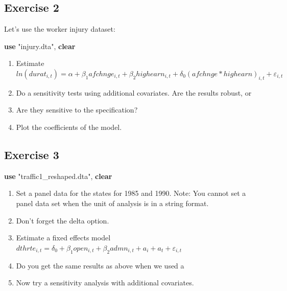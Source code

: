 \documentclass[
]{book}
\newenvironment{Shaded}{\begin{snugshade}}{\end{snugshade}}
\newcommand{\KeywordTok}[1]{\textcolor[rgb]{0.13,0.29,0.53}{\textbf{#1}}}
\newcommand{\NormalTok}[1]{#1}
\newcommand{\StringTok}[1]{\textcolor[rgb]{0.31,0.60,0.02}{#1}}
\providecommand{\tightlist}{%
  \setlength{\itemsep}{0pt}\setlength{\parskip}{0pt}}
\begin{document}
\subsection{Exercise 2}\label{exercise-2}

Let's use the worker injury dataset:

\begin{Shaded}
\begin{Highlighting}[]
\KeywordTok{use} \StringTok{"injury.dta"}\NormalTok{, }\KeywordTok{clear}
\end{Highlighting}
\end{Shaded}

\begin{enumerate}
\def\labelenumi{\arabic{enumi}.}
\item
  Estimate \(ln(durat_{i,t})=\alpha + \beta_1 afchnge_{i,t} + \beta_2 highearn_{i,t} + \delta_0 (afchnge*highearn)_{i,t} + \varepsilon_{i,t}\)
\item
  Do a sensitivity tests using additional covariates. Are the results robust, or
\item
  Are they sensitive to the specification?
\item
  Plot the coefficients of the model.
\end{enumerate}

\subsection{Exercise 3}\label{exercise-3}

\begin{Shaded}
\begin{Highlighting}[]
\KeywordTok{use} \StringTok{"traffic1\_reshaped.dta"}\NormalTok{, }\KeywordTok{clear}
\end{Highlighting}
\end{Shaded}

\begin{enumerate}
\def\labelenumi{\arabic{enumi}.}
\tightlist
\item
  Set a panel data for the states for 1985 and 1990. Note: You cannot set a panel data set when the unit of analysis is in a string format.
\item
  Don't forget the delta option.
\item
  Estimate a fixed effects model \(dthrte_{i,t}= \delta_0 + \beta_1 open_{i,t} + \beta_2  admn_{i,t} + a_i + a_t +  \varepsilon_{i,t}\)
\item
  Do you get the same results as above when we used a
\item
  Now try a sensitivity analysis with additional covariates.
\end{enumerate}
\end{document}
